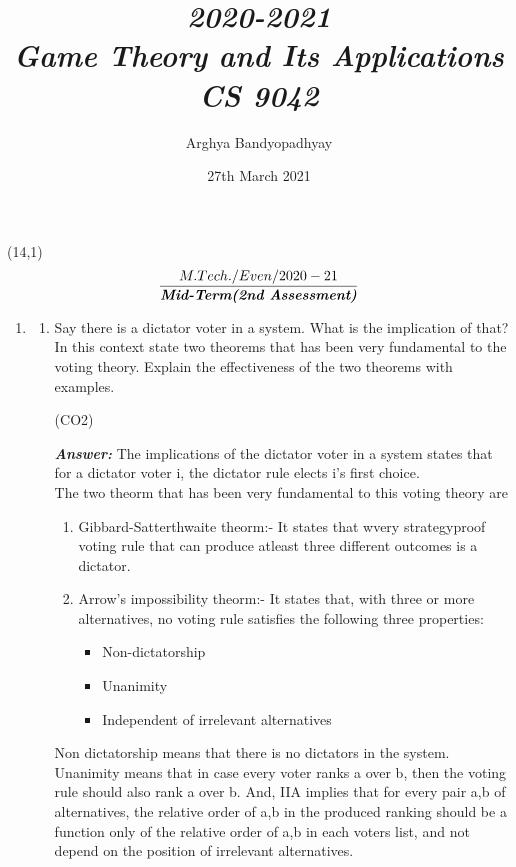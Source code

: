 \documentclass[15pt]{article}
\title{\emph{2020-2021\\Game Theory and Its Applications\\CS 9042}}
\author{
Arghya Bandyopadhyay
}
\date{27th March 2021}
\begin{document}
\begin{textblock}{5}(14,1)
\noindent\Large \[\frac{M.Tech./Even/2020-21}{\textbf{\emph{Mid-Term(2nd Assessment)}}}\]
\end{textblock}
\maketitle
\begin{enumerate}
\item
\begin{enumerate}
\item

Say there is a dictator voter in a system. What is the implication
of that? In this context state two theorems that has been very
fundamental to the voting theory. Explain the effectiveness of the
two theorems with examples.
\begin{flushright}
[1+2+2] (CO2)
\end{flushright}
\textbf{\emph{Answer: }}The implications of the dictator voter in a system states that for a dictator voter i, the dictator rule elects i's first choice.\\
The two theorm that has been very fundamental to this voting theory are\\

\begin{enumerate}
\item Gibbard-Satterthwaite theorm:- It states that wvery strategyproof voting rule that can produce atleast three different outcomes is a dictator.
\item Arrow's impossibility theorm:- It states that, with three or more alternatives, no voting rule satisfies the following three properties:
\begin{itemize}
\item Non-dictatorship
\item Unanimity
\item Independent of irrelevant alternatives
\end{itemize}
\end{enumerate}

Non dictatorship means that there is no dictators in the system. Unanimity means that in case every voter ranks a over b, then the voting rule should also rank a over b. And, IIA implies that for every pair a,b of alternatives, the relative order of a,b in the produced ranking should be a function only of the relative order of a,b in each voters list, and not depend on the position of irrelevant alternatives.


\end{enumerate}
\end{enumerate}
\end{document}
